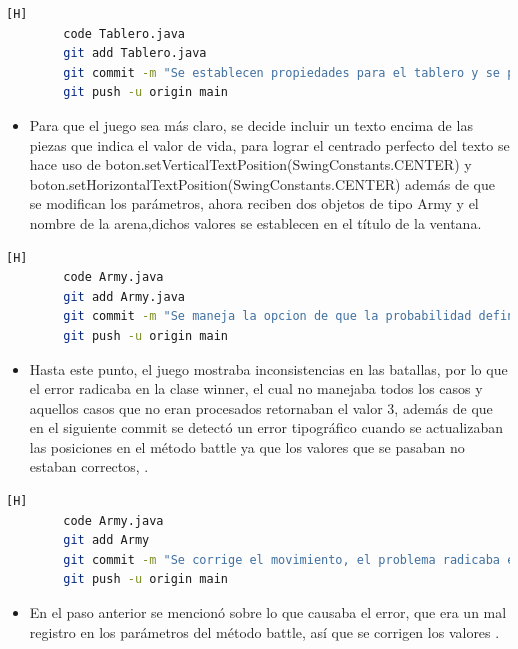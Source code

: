\documentclass{article}
\begin{document}
	
		\begin{lstlisting}[language=bash,caption={Commit: 9220747824333dea82bfc24cd3401bdbbb246304 }][H]
		code Tablero.java
		git add Tablero.java
		git commit -m "Se establecen propiedades para el tablero y se pone la vida de los soldados encima de los botones"			
		git push -u origin main
	\end{lstlisting}
	
	
	\begin{itemize}
		\item Para que el juego sea más claro, se decide incluir un texto encima de las piezas que indica el valor de vida, para lograr el centrado perfecto del texto se hace uso de  boton.setVerticalTextPosition(SwingConstants.CENTER) y
		boton.setHorizontalTextPosition(SwingConstants.CENTER) además de que se modifican los parámetros, ahora reciben dos objetos de tipo Army y el nombre de la arena,dichos valores se establecen en el título de la ventana.
	\end{itemize}
	
	

		\begin{lstlisting}[language=bash,caption={Commit: 1aa785c91270143c1ff8fd449aa286693d84ed7c }][H]
		code Army.java
		git add Army.java
		git commit -m "Se maneja la opcion de que la probabilidad definitiva salga igual a las ya calculadas, se compila y sale un error en la actualizacion de las fichas"			
		git push -u origin main
	\end{lstlisting}
	
	
	\begin{itemize}
		\item Hasta este punto, el juego mostraba inconsistencias en las batallas, por lo que el error radicaba en la clase winner, el cual no manejaba todos los casos y aquellos casos que no eran procesados retornaban el valor 3, además de que en el siguiente commit se detectó un error tipográfico cuando se actualizaban las posiciones en el método battle ya que los valores que se pasaban no estaban correctos, .
	\end{itemize}
	

	\begin{lstlisting}[language=bash,caption={Commit: 08c58e08ef28150018984f2ac92a45b89c176de7 }][H]
		code Army.java
		git add Army
		git commit -m "Se corrige el movimiento, el problema radicaba en el metodo battle"			
		git push -u origin main
	\end{lstlisting}
	
	
	\begin{itemize}
		\item En el paso anterior se mencionó sobre lo que causaba el error, que era un mal registro en los parámetros del método battle, así que se corrigen los valores .
	\end{itemize}
	
\end{document}
